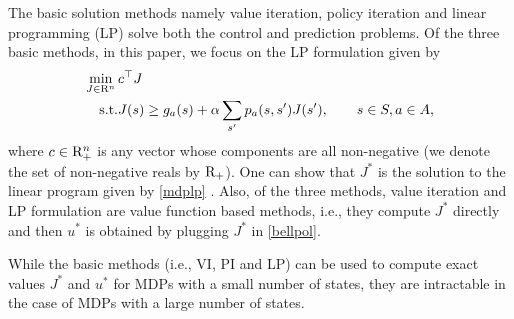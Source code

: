 The basic solution methods namely value iteration, policy iteration and linear programming (LP) \cite{BertB} solve both the control and prediction problems. Of the three basic methods, in this paper, we focus on the LP formulation given by
\begin{align}\label{mdplp}
\begin{split}
\min_{J\in \R^n}\, &c^\top J\\
\text{s.t.}\mb &J(s)\geq g_a(s)+\alpha\sum_{s'}p_a(s,s')J(s'), \qquad s\in S, a \in A,
\end{split}
\end{align}
where $c\in \mathrm{R}^n_+$ is any vector whose components are all non-negative (we denote the set of non-negative reals by $\mathrm{R}_+$). One can show that $J^*$ is the solution to the linear program given by \eqref{mdplp} \cite{BertB}. 
Also, of the three methods, value iteration and LP formulation are value function based methods, i.e., they compute $J^*$ directly and then $u^*$ is obtained by plugging $J^*$ in \eqref{bellpol}.

While the basic methods (i.e., VI, PI and LP) can be used to compute exact values $J^*$ and $u^*$ for MDPs with a small number of states, they are intractable in the case of MDPs with a large number of states.
